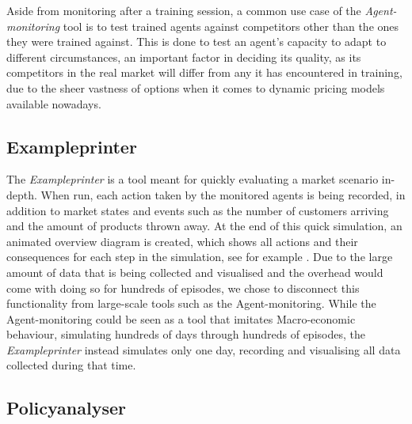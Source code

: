 Aside from monitoring after a training session, a common use case of the \emph{Agent-monitoring} tool is to test trained agents against competitors other than the ones they were trained against. This is done to test an agent's capacity to adapt to different circumstances, an important factor in deciding its quality, as its competitors in the real market will differ from any it has encountered in training, due to the sheer vastness of options when it comes to dynamic pricing models available nowadays. %

\subsection{Exampleprinter}\label{subsec:Exampleprinter}

The \emph{Exampleprinter} is a tool meant for quickly evaluating a market scenario in-depth. When run, each action taken by the monitored agents is being recorded, in addition to market states and events such as the number of customers arriving and the amount of products thrown away. At the end of this quick simulation, an animated overview diagram is created, which shows all actions and their consequences for each step in the simulation, see for example . Due to the large amount of data that is being collected and visualised and the overhead would come with doing so for hundreds of episodes, we chose to disconnect this functionality from large-scale tools such as the Agent-monitoring. While the Agent-monitoring could be seen as a tool that imitates Macro-economic behaviour, simulating hundreds of days through hundreds of episodes, the \emph{Exampleprinter} instead simulates only one day, recording and visualising all data collected during that time.

\subsection{Policyanalyser}\label{subsec:Policyanalyser}

